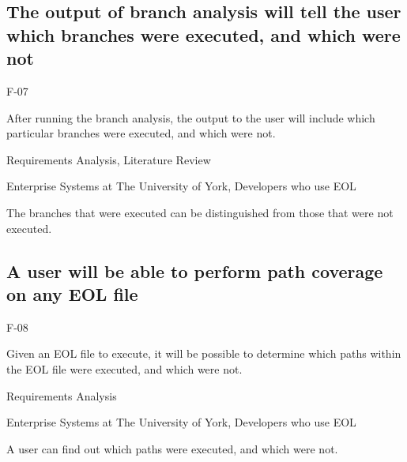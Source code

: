\subsection{The output of branch analysis will tell the user which branches were executed, and which were not}
\begin{description}[style=sameline,leftmargin=4.5cm,nolistsep]
\item[\hspace*{0.3cm}Label] F-07
\item[\hspace*{0.3cm}Description] After running the branch analysis, the output to the user will include which particular branches were executed, and which were not.
\item[\hspace*{0.3cm}Source] Requirements Analysis, Literature Review
\item[\hspace*{0.3cm}Stakeholders] Enterprise Systems at The University of York, Developers who use EOL
\item[\hspace*{0.3cm}Satisfiable Conditions] The branches that were executed can be distinguished from those that were not executed.
\end{description}

\subsection{A user will be able to perform path coverage on any EOL file}
\begin{description}[style=sameline,leftmargin=4.5cm,nolistsep]
\item[\hspace*{0.3cm}Label] F-08
\item[\hspace*{0.3cm}Description] Given an EOL file to execute, it will be possible to determine which paths within the EOL file were executed, and which were not.
\item[\hspace*{0.3cm}Source] Requirements Analysis
\item[\hspace*{0.3cm}Stakeholders] Enterprise Systems at The University of York, Developers who use EOL
\item[\hspace*{0.3cm}Satisfiable Conditions] A user can find out which paths were executed, and which were not.
\end{description}

